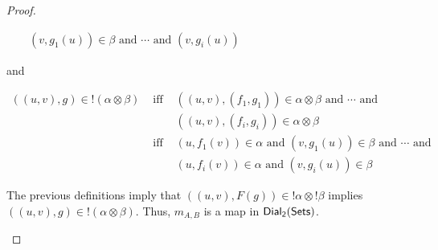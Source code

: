 \begin{proof}
\begin{center}
\begin{itemize}
\begin{center}
\begin{math}
\begin{array}{lll}
            &              & (v,g_1(u)) \in \beta \text{ and } \cdots \text{ and } (v,g_i(u)) 
          \end{array}
        \end{math}
      \end{center}
      and
      \begin{center}
        \begin{math}
          \begin{array}{lll}
            ((u,v),g) \in !(\alpha \otimes \beta) 
            & \text{ iff } & ((u,v),(f_1,g_1)) \in \alpha \otimes \beta \text{ and } \cdots \text{ and } \\
            &              & ((u,v),(f_i,g_i)) \in \alpha \otimes \beta\\
            & \text{ iff } & (u,f_1(v)) \in \alpha \text{ and } (v,g_1(u)) \in \beta \text{ and } \cdots \text{ and } \\
            &              & (u,f_i(v)) \in \alpha \text{ and } (v,g_i(u)) \in \beta
          \end{array}
        \end{math}
      \end{center}
      The previous definitions imply that
      $((u,v),F(g)) \in !\alpha \otimes !\beta$ implies
      $((u,v),g) \in !(\alpha \otimes \beta)$.  Thus, $m_{A,B}$ is a map in $\mathsf{Dial_2}(\mathsf{Sets})$.
      

\end{itemize}
\end{center}
\end{proof}
